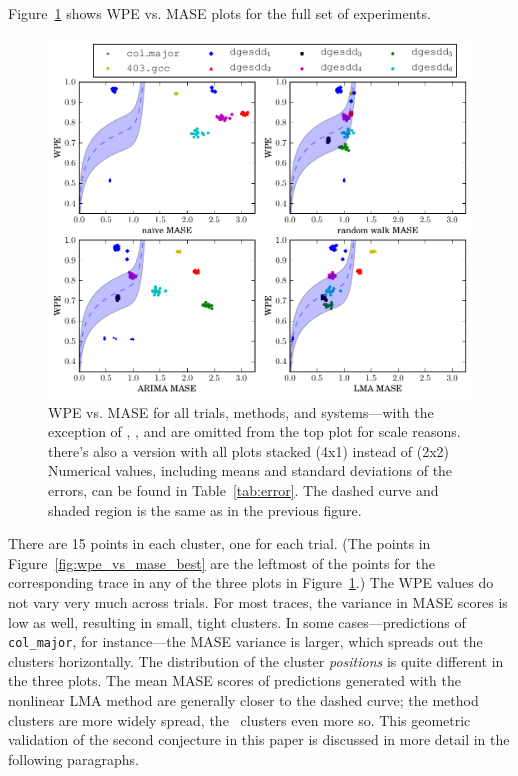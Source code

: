 Figure~\ref{fig:wpe_vs_mase_all} shows WPE vs. MASE plots for the full
set of experiments.
\begin{figure}
  \centering
  \includegraphics[width=\columnwidth]{figs/new_predictions_vs_entropy4a}
\caption{WPE vs. MASE for all trials, methods, and systems---with the
  exception of \svdone, \svdthree, and \svdfive are omitted from the
  top plot for scale reasons. \alert{there's also a version with all plots
  stacked (4x1) instead of (2x2)}
%
%
Numerical values, including means and standard deviations of the
errors, can be found in Table~\ref{tab:error}.  The dashed curve and
shaded region is the same as in the previous figure.  }
    \label{fig:wpe_vs_mase_all}
\end{figure}
There are 15 points in each cluster, one for each trial.  (The points
in Figure~\ref{fig:wpe_vs_mase_best} are the leftmost of the points
for the corresponding trace in any of the three plots in
Figure~\ref{fig:wpe_vs_mase_all}.)  The WPE values do not vary very
much across trials.  For most traces, the variance in MASE scores is
low as well, resulting in small, tight clusters.  In some
cases---\arima predictions of {\tt col\_major}, for instance---the
MASE variance is larger, which spreads out the clusters horizontally.
The distribution of the cluster \emph{positions} is quite different in
the three plots.  The mean MASE scores of predictions generated with
the nonlinear LMA method are generally closer to the dashed curve; the
\arima method clusters are more widely spread, the \naive ~clusters
even more so.  This geometric validation of the second conjecture in
this paper is discussed in more detail in the following paragraphs.

